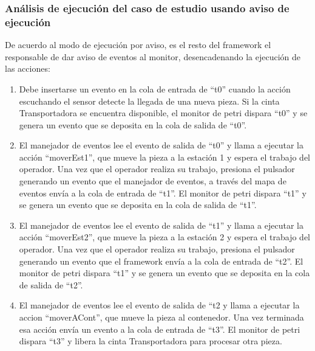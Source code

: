 \subsubsection{Análisis de ejecución del caso de estudio usando aviso de
ejecución} 
De acuerdo al modo de ejecución por aviso, es el resto del framework el
responsable de dar aviso de eventos al monitor, desencadenando la ejecución de las acciones:
\begin{enumerate}
    \item Debe insertarse un evento en la cola de entrada de “t0” cuando la
    acción escuchando el sensor detecte la llegada de una nueva pieza. Si la
    cinta Transportadora se encuentra disponible, el monitor de petri dispara
    “t0” y se genera un evento que se deposita en la cola de salida de “t0”.
    \item El manejador de eventos lee el evento de salida de “t0” y llama a
    ejecutar la acción “moverEst1”, que mueve la pieza a la estación 1 y espera
    el trabajo del operador. Una vez que el operador realiza su trabajo,
    presiona el pulsador generando un evento que el manejador de eventos, a través del
    mapa de eventos envía a la cola de entrada de “t1”. El monitor de petri
    dispara “t1” y se genera un evento que se deposita en la cola de salida de
    “t1”.
    \item El manejador de eventos lee el evento de salida de “t1” y llama a
    ejecutar la acción “moverEst2”, que mueve la pieza a la estación 2 y espera
    el trabajo del operador. Una vez que el operador realiza su trabajo,
    presiona el pulsador generando un evento que el framework envía a la cola
    de  entrada de “t2”. El monitor de petri dispara “t1” y se genera un evento
    que se deposita en la cola de salida de “t2”.
    \item El manejador de eventos lee el evento de salida de “t2 y llama a
    ejecutar la accion “moverACont”, que mueve la pieza al contenedor. Una vez
    terminada esa acción envía un evento a la cola de entrada de “t3”. El
    monitor de petri dispara “t3” y libera la cinta Transportadora para procesar otra pieza.
\end{enumerate}

